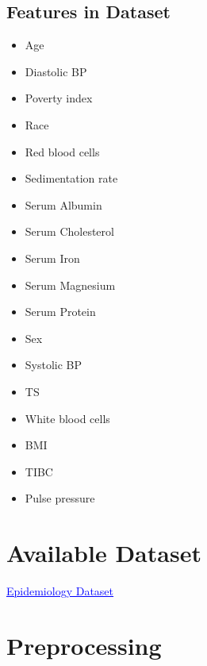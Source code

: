 \documentclass[5 pt]{article}
\begin{document}
\newpage
\subsection{Features in Dataset}

\begin{multicols}{4}
	\begin{itemize}
		\item  Age
		\item  Diastolic BP
		\item  Poverty index
		\item  Race
	\end{itemize}
\columnbreak
	\begin{itemize}
		\item Red blood cells
		\item Sedimentation rate
		\item Serum Albumin
		\item Serum Cholesterol
	\end{itemize}
\columnbreak
	\begin{itemize}
		\item Serum Iron
		\item Serum Magnesium
		\item Serum Protein
		\item Sex
				\item Systolic BP
	\end{itemize}
\columnbreak
	\begin{itemize}
		\item TS
		\item White blood cells
		\item BMI
		\item TIBC
				\item Pulse pressure
	\end{itemize}
		
	
	
\end{multicols}


\section{Available Dataset}

\href{https://wwwn.cdc.gov/nchs/nhanes/nhefs/default.aspx/}{\hspace{6.5cm}
\textcolor{blue}{\underline{Epidemiology Dataset}}}

\section{Preprocessing}
\end{document}
